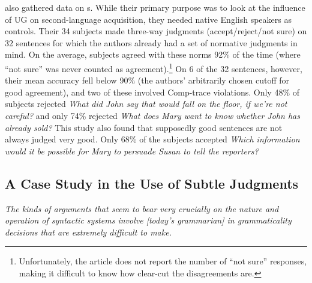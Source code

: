 \citet{BleyVromanEtAl1988} also gathered data on s. While their primary purpose was to look at the
influence of UG on second-language acquisition, they needed native English speakers as controls. Their 34 subjects made three-way judgments (accept/reject/not sure) on 32 sentences for which the authors already had a set of normative judgments in mind. On the average, subjects agreed with these norms 92\% of the time (where ``not sure'' was never counted as agreement).\footnote{Unfortunately, the article does not report the number of ``not sure'' responses, making it difficult to know how clear-cut the disagreements are.}
 On 6 of the 32 sentences, however, their mean
accuracy fell below 90\% (the authors' arbitrarily chosen cutoff for good agreement), and two of these involved Comp-trace violations. Only 48\% of subjects rejected  \textit{What did John say that would fall  on the floor,  if we're not careful?} and
only 74\% rejected \textit{What does Mary want to know whether John has already sold?} This study also found that supposedly good sentences are not always judged very good. Only 68\% of the subjects accepted \textit{Which information would it be possible for Mary to persuade  Susan to tell the reporters?}

\subsection{A Case Study in the Use of Subtle Judgments}\label{sec:2.3.3} 

\epigraph{\itshape The kinds of arguments that seem to bear very crucially on the nature and operation of syntactic systems involve [today's grammarian] in grammaticality decisions that are extremely difficult to make.\\[-2\baselineskip]}{\citep{Fillmore1972}}

